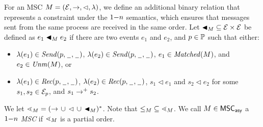 \documentclass{article}
\begin{document}

\begin{definition} \label{def:one_n_alt}
For an MSC $M = (\mathcal{E},\to,\lhd,\lambda)$, we define
an additional binary relation that represents a constraint
under the $1\mathsf{-}n$ semantics, which ensures that messages sent from the same process are received in the same order. Let ${\blacktriangleleft}_M \subseteq \mathcal{E} \times \mathcal{E}$ be defined as $e_1 \blacktriangleleft_M e_2$ if there are two events $e_1$ and $e_2$, and $p \in \mathbb{P}$ such that either:
\begin{itemize}\itemsep=0.5ex
	\item $\lambda(e_1) \in {\mathit{Send}(p,\hspace{0.1em}\underline{\hspace{0.5em}}\hspace{0.1em},\hspace{0.1em}\underline{\hspace{0.5em}}\hspace{0.1em})}$, $\lambda(e_2) \in {\mathit{Send}(p,\hspace{0.1em}\underline{\hspace{0.5em}}\hspace{0.1em},\hspace{0.1em}\underline{\hspace{0.5em}}\hspace{0.1em})}$, $e_1 \in \mathit{Matched}(M)$, and $e_2 \in \mathit{Unm}(M)$, or
	\item $\lambda(e_1) \in {\mathit{Rec}(p,\hspace{0.1em}\underline{\hspace{0.5em}}\hspace{0.1em},\hspace{0.1em}\underline{\hspace{0.5em}}\hspace{0.1em})}$, $\lambda(e_2) \in {\mathit{Rec}(p,\hspace{0.1em}\underline{\hspace{0.5em}}\hspace{0.1em},\hspace{0.1em}\underline{\hspace{0.5em}}\hspace{0.1em})}$, $s_1 \lhd e_1$ and $s_2 \lhd e_2$ for some $s_1,s_2 \in \mathcal{E}_p$, and $s_1 \to^+ s_2$.
\end{itemize}

We let ${\lessdot_M} = ({\to} \,\cup\, {\lhd} \,\cup\, {\blacktriangleleft_M})^\ast$.
Note that ${\le_M} \subseteq {\lessdot_M}$.
%
	We call $M \in \mathsf{MSC}_{\mathsf{asy}}$ a \emph{$1\mathsf{-}n$ MSC}
	if ${\lessdot_M}$ is a partial order.
\end{definition}

\end{document}
